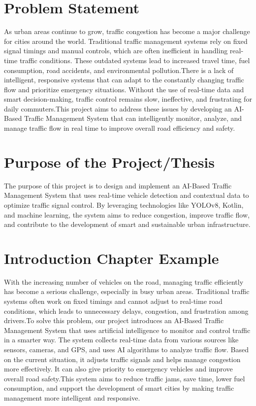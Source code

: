 \section{Problem Statement} As urban areas continue to grow, traffic congestion has become a major challenge for cities around the world. Traditional traffic management systems rely on fixed signal timings and manual controls, which are often inefficient in handling real-time traffic conditions. These outdated systems lead to increased travel time, fuel consumption, road accidents, and environmental pollution.There is a lack of intelligent, responsive systems that can adapt to the constantly changing traffic flow and prioritize emergency situations. Without the use of real-time data and smart decision-making, traffic control remains slow, ineffective, and frustrating for daily commuters.This project aims to address these issues by developing an AI-Based Traffic Management System that can intelligently monitor, analyze, and manage traffic flow in real time to improve overall road efficiency and safety.

\section{Purpose of the Project/Thesis}
The purpose of this project is to design and implement an AI-Based Traffic Management System that uses real-time vehicle detection and contextual data to optimize traffic signal control. By leveraging technologies like YOLOv8, Kotlin, and machine learning, the system aims to reduce congestion, improve traffic flow, and contribute to the development of smart and sustainable urban infrastructure.

\section{Introduction Chapter Example}
With the increasing number of vehicles on the road, managing traffic efficiently has become a serious challenge, especially in busy urban areas. Traditional traffic systems often work on fixed timings and cannot adjust to real-time road conditions, which leads to unnecessary delays, congestion, and frustration among drivers.To solve this problem, our project introduces an AI-Based Traffic Management System that uses artificial intelligence to monitor and control traffic in a smarter way. The system collects real-time data from various sources like sensors, cameras, and GPS, and uses AI algorithms to analyze traffic flow. Based on the current situation, it adjusts traffic signals and helps manage congestion more effectively. It can also give priority to emergency vehicles and improve overall road safety.This system aims to reduce traffic jams, save time, lower fuel consumption, and support the development of smart cities by making traffic management more intelligent and responsive.

